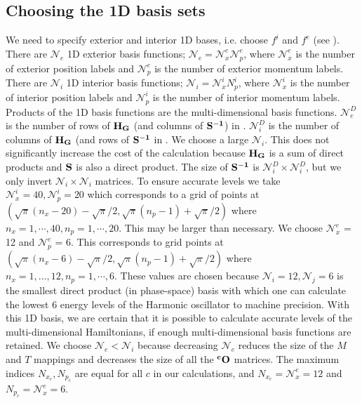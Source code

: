 \subsection{Choosing the 1D basis sets}


%

We need to specify  exterior and  interior  1D bases, i.e. choose $f^i$ and $f^e$ 
(see ).
  There are $\mathcal{N}_e$  1D exterior basis functions;  $\mathcal{N}_e = \mathcal{N}_x^e  \mathcal{N}_p^e$, where  $\mathcal{N}_x^e$ is the number of
exterior position labels and  $  \mathcal{N}_p^e$ is the number of exterior momentum labels.
 There are $\mathcal{N}_i$  1D interior basis functions;  $\mathcal{N}_i = \mathcal{N}_x^i  N_p^i$, where  $\mathcal{N}_x^i$ is the number of
interior  position labels and  $  \mathcal{N}_p^i$ is the number of interior  momentum labels.     
 Products of the  1D basis functions are  the multi-dimensional basis functions.
%
 $\mathcal{N}_e^D$ is the number of rows of ${\bf{H_G}}$  (and columns of    ${\bf{S^{-1}}}$)  in .    
 $\mathcal{N}_i^D$ is  the number of columns  of ${\bf{H_G}}$  (and rows of    ${\bf{S^{-1}}}$  in .    
We choose  a large  $\mathcal{N}_i$.   This does not significantly increase the cost of the calculation   because 
 ${\bf{H_G}}$ is a sum of direct products   and    ${\bf{S}  }$  is also a  direct product.     The size of   ${\bf{S^{-1}}}$  is
 $\mathcal{N}_i^D \times  \mathcal{N}_i^D$, but we only invert  $\mathcal{N}_i \times  \mathcal{N}_i$ matrices.
%
To ensure accurate levels we take  
 $\mathcal{N}_x^i=40,\mathcal{N}_p^i=20$ which corresponds to a  grid of points at 
$(\sqrt{\pi}(n_x-20)-\sqrt{\pi}/2,   \sqrt{\pi}(n_p-1)+\sqrt{\pi}/2)$  
where 
$n_x=1, \cdots ,40,n_p=1, \cdots, 20$.       
This may be larger than necessary.  
We choose       $\mathcal{N}_x^e$ = 12 and $\mathcal{N}_p^e$ = 6.      This  
 corresponds to grid points at $(\sqrt{\pi}
(n_x-6)-\sqrt{\pi}/2,     \sqrt{\pi}(n_p-1)+\sqrt{\pi}/2)$ where $n_x=1, \dots, 12,n_p=1, \cdots ,6$.  
These values are chosen because 
$\mathcal{N}_i=12,\mathcal{N}_j=6$ is the smallest  direct product (in phase-space) basis with which  one can 
calculate the lowest 6 energy levels of  the Harmonic oscillator to machine 
precision.    With this 1D basis, we are certain 
 that it is possible to calculate  accurate  levels of the multi-dimensional Hamiltonians, if enough multi-dimensional basis functions 
are retained.    We choose   $\mathcal{N}_e  < \mathcal{N}_i$ because decreasing   $\mathcal{N}_e$ reduces the size of the $M$ and $T$ mappings and 
decreases the size of all the ${\bf{ ^cO}}$ matrices.   
%
The maximum  indices $N_{x_c},N_{p_c}$ are equal for all $c$ in our calculations,  and 
 $N_{x_c}=\mathcal{N}_x^e=12$ and $N_{p_c}=\mathcal{N}_x^e=6$.


